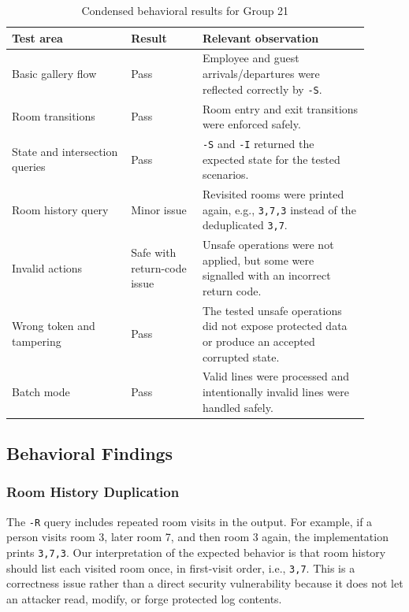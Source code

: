 \documentclass[a4paper, 12pt]{article}
\begin{document}
    \begin{table}[H]
        \centering
        \small
        \begin{tabular}{p{0.30\linewidth}p{0.18\linewidth}p{0.42\linewidth}}
            \toprule
            \textbf{Test area} & \textbf{Result} & \textbf{Relevant observation} \\
            \midrule
            Basic gallery flow & Pass & Employee and guest arrivals/departures were reflected correctly by \texttt{-S}. \\
            Room transitions & Pass & Room entry and exit transitions were enforced safely. \\
            State and intersection queries & Pass & \texttt{-S} and \texttt{-I} returned the expected state for the tested scenarios. \\
            Room history query & Minor issue & Revisited rooms were printed again, e.g., \texttt{3,7,3} instead of the deduplicated \texttt{3,7}. \\
            Invalid actions & Safe with return-code issue & Unsafe operations were not applied, but some were signalled with an incorrect return code. \\
            Wrong token and tampering & Pass & The tested unsafe operations did not expose protected data or produce an accepted corrupted state. \\
            Batch mode & Pass & Valid lines were processed and intentionally invalid lines were handled safely. \\
            \bottomrule
        \end{tabular}
        \caption{Condensed behavioral results for Group 21}
        \label{tab:g21-behavioral-results}
    \end{table}

    \subsection{Behavioral Findings}
    \subsubsection{Room History Duplication}
    The \texttt{-R} query includes repeated room visits in the output. For example, if a person visits room 3, later room 7, and then room 3 again, the implementation prints \texttt{3,7,3}. Our interpretation of the expected behavior is that room history should list each visited room once, in first-visit order, i.e., \texttt{3,7}. This is a correctness issue rather than a direct security vulnerability because it does not let an attacker read, modify, or forge protected log contents.
\end{document}
